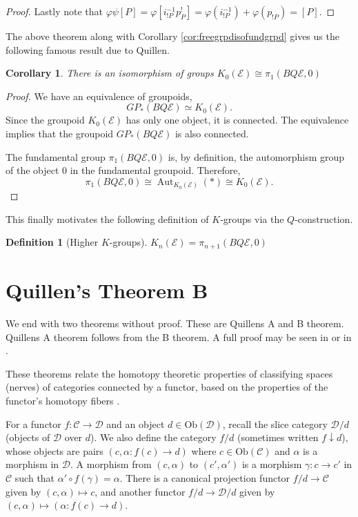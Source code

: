 \documentclass[12pt]{report}
\numberwithin{equation}{section}
\newtheorem{definition}[dummy]{Definition}
\newtheorem{corollary}[dummy]{Corollary}
\begin{document}
\begin{proof}
			
			Lastly note that \( \varphi \psi [P]=\varphi[i^{-1}_{!P} p^!_P]=\varphi(i^{-1}_{!P})+ \varphi(p_{!P})=[P] \). 	
		\end{proof}
		
	
	The above theorem along with Corollary \ref{cor:freegrpdisofundgrpd} gives us the following famous result due to Quillen.
	\begin{corollary}
			There is an isomorphism of groups \( K_0(\mathcal{E}) \cong \pi_1(BQ\mathcal{E},0) \)
	\end{corollary}
	\begin{proof}
		 We have an equivalence of groupoids,
		 \[  GP_*(BQ \mathcal{E}) \simeq K_0(\mathcal{E}). \]
		 Since the groupoid $K_0(\mathcal{E})$ has only one object, it is connected. The equivalence implies that the groupoid $GP_*(BQ\mathcal{E})$ is also connected.
		 
		 The fundamental group $\pi_1(BQ\mathcal{E}, 0)$ is, by definition, the automorphism group of the object $0$ in the fundamental groupoid. Therefore,
		 \[ \pi_1(BQ\mathcal {E}, 0) \cong \operatorname{Aut}_{K_0(\mathcal{E})}(*) \cong K_0(\mathcal{E}). \]
		 
	\end{proof}
	
	This finally motivates the following definition of \( K \)-groups via the \( Q \)-construction.
	\begin{definition}[Higher $K$-groups]
		\(K_n(\mathcal{E})= \pi_{n+1}(BQ\mathcal{E},0)\)
	\end{definition}
	
	\section{Quillen's Theorem B}
	We end with two theorems without proof. These are Quillens A and B theorem. Quillens A theorem follows from the B theorem. A full proof may be seen in \cite{quillenhigherktheoryI} or in \cite{Goerss_Jardine_2009}.	

	
	These theorems relate the homotopy theoretic properties of classifying spaces (nerves) of categories connected by a functor, based on the properties of the functor's homotopy fibers .

	
	For a functor $f: \mathcal{C} \to \mathcal{D}$ and an object $d \in \mathrm{Ob}(\mathcal{D})$, recall the slice category $\mathcal{D}/d$ (objects of $\mathcal{D}$ over $d$). We also define the category $f/d$ (sometimes written $f \downarrow d$), whose objects are pairs $(c, \alpha: f(c) \to d)$ where $c \in \mathrm{Ob}(\mathcal{C})$ and $\alpha$ is a morphism in $\mathcal{D}$. A morphism from $(c, \alpha)$ to $(c', \alpha')$ is a morphism $\gamma: c \to c'$ in $\mathcal{C}$ such that $\alpha' \circ f(\gamma) = \alpha$. There is a canonical projection functor $f/d \to \mathcal{C}$ given by $(c, \alpha) \mapsto c$, and another functor $f/d \to \mathcal{D}/d$ given by $(c, \alpha) \mapsto (\alpha: f(c) \to d)$.
	
\end{document}
